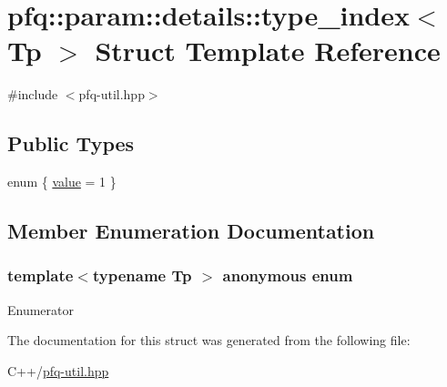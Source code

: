\hypertarget{structpfq_1_1param_1_1details_1_1type__index_3_01Tp_01_4}{\section{pfq\+:\+:param\+:\+:details\+:\+:type\+\_\+index$<$ Tp $>$ Struct Template Reference}
\label{structpfq_1_1param_1_1details_1_1type__index_3_01Tp_01_4}
}


{\ttfamily \#include $<$pfq-\/util.\+hpp$>$}

\subsection*{Public Types}
\begin{DoxyCompactItemize}
\item 
enum \{ \hyperlink{structpfq_1_1param_1_1details_1_1type__index_3_01Tp_01_4_af9d771ebd1b38996ae3631c8330e6bdda74fe01056516d2934b6ce777009cffe4}{value} = 1
 \}
\end{DoxyCompactItemize}


\subsection{Member Enumeration Documentation}
\hypertarget{structpfq_1_1param_1_1details_1_1type__index_3_01Tp_01_4_af9d771ebd1b38996ae3631c8330e6bdd}{\subsubsection[{anonymous enum}]{\setlength{\rightskip}{0pt plus 5cm}template$<$typename Tp $>$ anonymous enum}}\label{structpfq_1_1param_1_1details_1_1type__index_3_01Tp_01_4_af9d771ebd1b38996ae3631c8330e6bdd}
\begin{Desc}
\item[Enumerator]\par
\begin{description}
\item[{\em 
\hypertarget{structpfq_1_1param_1_1details_1_1type__index_3_01Tp_01_4_af9d771ebd1b38996ae3631c8330e6bdda74fe01056516d2934b6ce777009cffe4}{value}\label{structpfq_1_1param_1_1details_1_1type__index_3_01Tp_01_4_af9d771ebd1b38996ae3631c8330e6bdda74fe01056516d2934b6ce777009cffe4}
}]\end{description}
\end{Desc}


The documentation for this struct was generated from the following file\+:\begin{DoxyCompactItemize}
\item 
C++/\hyperlink{pfq-util_8hpp}{pfq-\/util.\+hpp}\end{DoxyCompactItemize}
